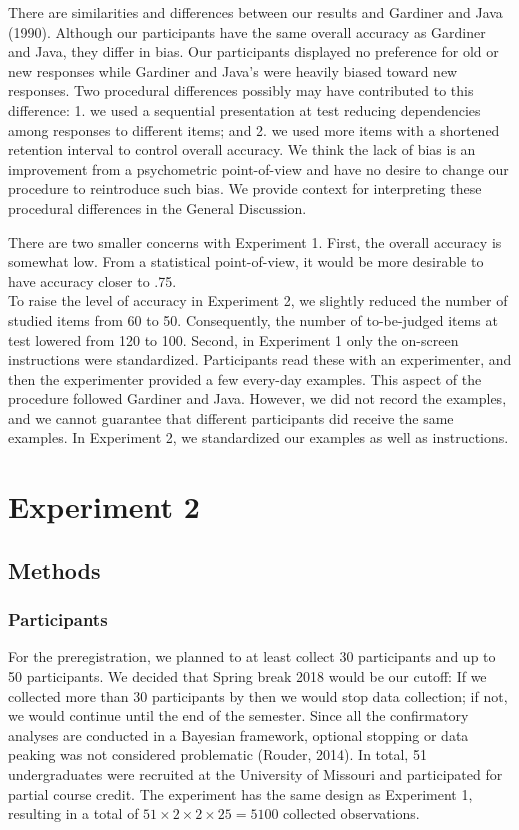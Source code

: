 \documentclass[english,,man]{apa6}
\begin{document}
There are similarities and differences between our results and Gardiner and Java (1990). Although our participants have the same overall accuracy as Gardiner and Java, they differ in bias. Our participants displayed no preference for old or new responses while Gardiner and Java's were heavily biased toward new responses. Two procedural differences possibly may have contributed to this difference: 1. we used a sequential presentation at test reducing dependencies among responses to different items; and 2. we used more items with a shortened retention interval to control overall accuracy. We think the lack of bias is an improvement from a psychometric point-of-view and have no desire to change our procedure to reintroduce such bias. We provide context for interpreting these procedural differences in the General Discussion.

There are two smaller concerns with Experiment 1. First, the overall accuracy is somewhat low. From a statistical point-of-view, it would be more desirable to have accuracy closer to .75.\\
To raise the level of accuracy in Experiment 2, we slightly reduced the number of studied items from 60 to 50. Consequently, the number of to-be-judged items at test lowered from 120 to 100. Second, in Experiment 1 only the on-screen instructions were standardized. Participants read these with an experimenter, and then the experimenter provided a few every-day examples. This aspect of the procedure followed Gardiner and Java. However, we did not record the examples, and we cannot guarantee that different participants did receive the same examples. In Experiment 2, we standardized our examples as well as instructions.

\hypertarget{experiment-2}{%
\section{Experiment 2}\label{experiment-2}}

\hypertarget{methods-1}{%
\subsection{Methods}\label{methods-1}}

\hypertarget{participants}{%
\subsubsection{Participants}\label{participants}}

For the preregistration, we planned to at least collect 30 participants and up to 50 participants. We decided that Spring break 2018 would be our cutoff: If we collected more than 30 participants by then we would stop data collection; if not, we would continue until the end of the semester. Since all the confirmatory analyses are conducted in a
Bayesian framework, optional stopping or data peaking was not considered problematic (Rouder, 2014). In total, 51 undergraduates were recruited at the University of Missouri and participated for partial course credit. The experiment has the same design as Experiment 1, resulting in a total of \(51 \times 2 \times 2 \times 25 = 5100\) collected observations.
\end{document}
